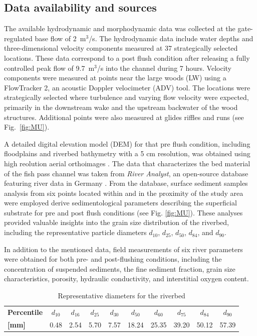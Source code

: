 \documentclass[draft,linenumbers,onecolumn]{agujournal2019} %
\begin{document}
\subsection{Data availability and sources}
\label{sec:Sec2.2}
The available hydrodynamic and morphodynamic data was collected at the gate-regulated base flow of 2~m$^3$/s. 
The hydrodynamic data include water depths and three-dimensional velocity components measured at 37 strategically selected locations. 
These data correspond to a post flush condition after releasing a fully controlled peak flow of 9.7~m$^3$/s into the channel during 7 hours. 
Velocity components were measured at points near the large woods (LW) using a FlowTracker 2, an acoustic Doppler velocimeter (ADV) tool. 
The locations were strategically selected where turbulence and varying flow velocity were expected, primarily in the downstream wake and the upstream backwater of the wood structures. Additional points were also measured at glides riffles and runs (see Fig.~\ref{fig:MU}). 

A detailed digital elevation model (DEM) for that pre flush condition, including floodplains and riverbed bathymetry with a 5 cm resolution, was obtained using high reolution aerial orthoimages \cite{schwindt2023fuzzylogic}. The data that characterizes the bed material of the fish pass channel was taken from \textit{River Analyst}, an open-source database featuring river data in Germany \cite{negreiros2023database}. From the database, surface sediment samples analysis from six points located within and in the proximity of the study area were employed derive sedimentological parameters describing the superficial substrate for pre and post flush conditions  (see Fig. \ref{fig:MU}). These analyses provided valuable insights into the grain size distribution of the riverbed, including the representative particle diameters \(d_{10}\), \(d_{25}\), \(d_{50}\), \(d_{84}\), and \(d_{90}\).


In addition to the mentioned data, field measurements of six river parameters were obtained for both pre- and post-flushing conditions, including the concentration of suspended sediments, the fine sediment fraction, grain size characteristics, porosity, hydraulic conductivity, and interstitial oxygen content. 

\begin{table}[ht]
	\centering
	\caption{Representative diameters for the riverbed}
	\begin{tabular}{lccccccccc}
		\hline
		\textbf{Percentile} & \(d_{10}\) & \(d_{16}\) & \(d_{25}\) & \(d_{30}\) & \(d_{50}\) & \(d_{60}\) & \(d_{75}\) & \(d_{84}\) & \(d_{90}\) \\
		\textbf{[mm]}       & 0.48      & 2.54      & 5.70      & 7.57      & 18.24     & 25.35     & 39.20     & 50.12     & 57.39     \\
		\hline
	\end{tabular}
	\label{tab:rep_diameters}
\end{table}
\end{document}
